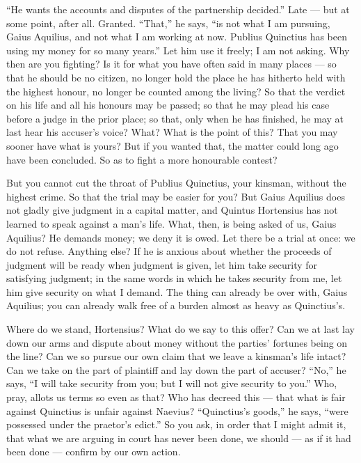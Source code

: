  ``He wants the accounts and disputes of the partnership decided.'' Late --- but at some point, after all. Granted. ``That,'' he says, ``is not what I am pursuing, Gaius Aquilius, and not what I am working at now. Publius Quinctius has been using my money for so many years.'' Let him use it freely; I am not asking. Why then are you fighting? Is it for what you have often said in many places --- so that he should be no citizen, no longer hold the place he has hitherto held with the highest honour, no longer be counted among the living? So that the verdict on his life and all his honours may be passed; so that he may plead his case before a judge in the prior place; so that, only when he has finished, he may at last hear his accuser's voice? What? What is the point of this? That you may sooner have what is yours? But if you wanted that, the matter could long ago have been concluded. So as to fight a more honourable contest?

 But you cannot cut the throat of Publius Quinctius, your kinsman, without the highest crime. So that the trial may be easier for you? But Gaius Aquilius does not gladly give judgment in a capital matter, and Quintus Hortensius has not learned to speak against a man's life. What, then, is being asked of us, Gaius Aquilius? He demands money; we deny it is owed. Let there be a trial at once: we do not refuse. Anything else? If he is anxious about whether the proceeds of judgment will be ready when judgment is given, let him take security for satisfying judgment; in the same words in which he takes security from me, let him give security on what I demand. The thing can already be over with, Gaius Aquilius; you can already walk free of a burden almost as heavy as Quinctius's.

 Where do we stand, Hortensius? What do we say to this offer? Can we at last lay down our arms and dispute about money without the parties' fortunes being on the line? Can we so pursue our own claim that we leave a kinsman's life intact? Can we take on the part of plaintiff and lay down the part of accuser? ``No,'' he says, ``I will take security from you; but I will not give security to you.'' Who, pray, allots us terms so even as that? Who has decreed this --- that what is fair against Quinctius is unfair against Naevius? ``Quinctius's goods,'' he says, ``were possessed under the praetor's edict.'' So you ask, in order that I might admit it, that what we are arguing in court has never been done, we should --- as if it had been done --- confirm by our own action.

